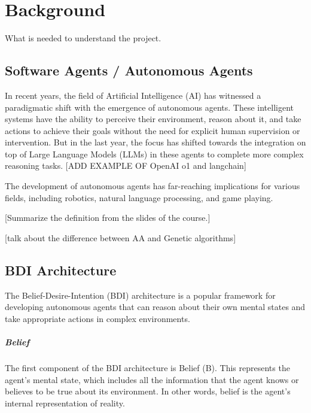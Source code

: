 \chapter{Background}

What is needed to understand the project.

\section{Software Agents / Autonomous Agents}

In recent years, the field of Artificial Intelligence (AI) has witnessed a
paradigmatic shift with the emergence of autonomous agents. These intelligent systems
have the ability to perceive their environment, reason about it, and take actions
to achieve their goals without the need for explicit human supervision or intervention.
But in the last year, the focus has shifted towards the integration on top of Large
Language Models (LLMs) in these agents to complete more complex reasoning tasks.
[ADD EXAMPLE OF OpenAI o1 and langchain]

The development of autonomous agents has far-reaching implications for various fields,
including robotics, natural language processing, and game playing.

[Summarize the definition from the slides of the course.]

[talk about the difference between AA and Genetic algorithms]

\section{BDI Architecture}
The Belief-Desire-Intention (BDI) architecture is a popular framework for developing
autonomous agents that can reason about their own mental states and take appropriate
actions in complex environments.

\paragraph{Belief}
The first component of the BDI architecture is Belief (B). This represents the agent's
mental state, which includes all the information that the agent knows or
believes to be true about its environment. In other words, belief is the agent's
internal representation of reality.

